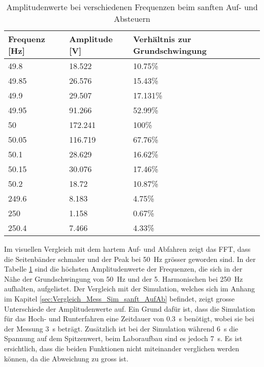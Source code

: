 \begin{table}[ht!]
	\centering
	\begin{tabular}{|l|l|l|}
		\hline
		Frequenz {[}Hz{]} & Amplitude {[}V{]} & Verhältnis zur Grundschwingung \\ \hline
		49.8              & 18.522            & 10.75\%                        \\ \hline
		49.85             & 26.576            & 15.43\%                        \\ \hline
		49.9              & 29.507            & 17.131\%                       \\ \hline
		49.95             & 91.266            & 52.99\%                        \\ \hline
		50                & 172.241           & 100\%                          \\ \hline
		50.05             & 116.719           & 67.76\%                        \\ \hline
		50.1              & 28.629            & 16.62\%                        \\ \hline
		50.15             & 30.076            & 17.46\%                        \\ \hline
		50.2              & 18.72             & 10.87\%                        \\ \hline
		249.6             & 8.183             & 4.75\%                         \\ \hline
		250               & 1.158             & 0.67\%                         \\ \hline
		250.4             & 7.466             & 4.33\%                         \\ \hline
	\end{tabular}
\caption{Amplitudenwerte bei verschiedenen Frequenzen beim sanften Auf- und Absteuern}\label{tab:Mess_Spannung_AufAb_sanft}
\end{table}

Im visuellen Vergleich mit dem hartem Auf- und Abfahren zeigt das FFT, dass die Seitenbänder schmaler und der Peak bei \SI{50}{Hz} grösser geworden sind. In der Tabelle \ref{tab:Mess_Spannung_AufAb_sanft} sind die höchsten Amplitudenwerte der Frequenzen, die sich in der Nähe der Grundschwingung von \SI{50}{Hz} und der 5. Harmonischen bei \SI{250}{Hz} aufhalten, aufgelistet. Der Vergleich mit der Simulation, welches sich im Anhang im Kapitel \ref{sec:Vergleich_Mess_Sim_sanft_AufAb} befindet, zeigt grosse Unterschiede der Amplitudenwerte auf. Ein Grund dafür ist, dass die Simulation für das Hoch- und Runterfahren eine Zeitdauer von \SI{0.3}{s} benötigt, wobei sie bei der Messung \SI{3}{s} beträgt. Zusätzlich ist bei der Simulation während \SI{6}{s} die Spannung auf dem Spitzenwert, beim Laboraufbau sind es jedoch \SI{7}{s}. Es ist ersichtlich, dass die beiden Funktionen nicht miteinander verglichen werden können, da die Abweichung zu gross ist.


